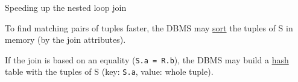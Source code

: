 %
%
\begin{frame}{Speeding up the nested loop join}
\label{nested_loop_join_with_indexing_inner_table}

To find matching pairs of tuples faster, the DBMS may \alert{\underline{sort} the tuples of S in memory} (by the join attributes).

If the join is based on an equality (\lstinline[style=SQL]{S.a = R.b}), the DBMS may \alert{build a \underline{hash} table with the tuples of S} (key: \lstinline[style=SQL]{S.a}, value: whole tuple).

\begin{center}
\end{center}
\end{frame}

